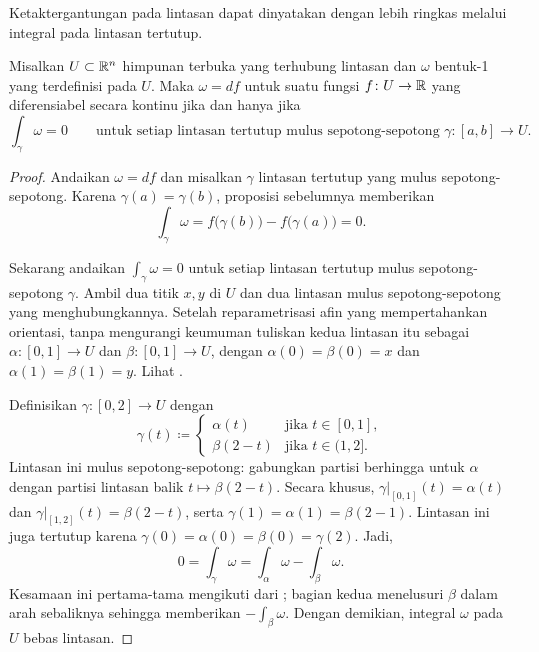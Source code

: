 Ketaktergantungan pada lintasan dapat dinyatakan dengan lebih ringkas melalui
integral pada lintasan tertutup.

\begin{prop}
Misalkan $U \subset {\mathbb{R}}^n$ himpunan terbuka yang terhubung lintasan dan $\omega$
bentuk-1 yang terdefinisi pada $U$. Maka $\omega = df$ untuk suatu fungsi
$f \colon U \to {\mathbb{R}}$ yang diferensiabel secara kontinu jika dan hanya jika
\begin{equation*}
\int_{\gamma} \omega = 0
\qquad
\text{untuk setiap lintasan tertutup mulus sepotong-sepotong }
\gamma \colon [a,b] \to U.
\end{equation*}
\end{prop}

\begin{proof}
Andaikan $\omega = df$ dan misalkan $\gamma$ lintasan tertutup yang mulus
sepotong-sepotong. Karena $\gamma(a) = \gamma(b)$, proposisi sebelumnya
memberikan
\begin{equation*}
\int_{\gamma} \omega = f\bigl(\gamma(b)\bigr) - f\bigl(\gamma(a)\bigr) = 0 .
\end{equation*}

Sekarang andaikan $\int_{\gamma} \omega = 0$ untuk setiap lintasan tertutup
mulus sepotong-sepotong $\gamma$. Ambil dua titik $x,y$ di $U$ dan dua lintasan
mulus sepotong-sepotong yang menghubungkannya. Setelah reparametrisasi afin yang
mempertahankan orientasi, tanpa mengurangi keumuman tuliskan kedua lintasan itu
sebagai $\alpha \colon [0,1] \to U$ dan $\beta \colon [0,1] \to U$, dengan
$\alpha(0) = \beta(0) = x$ dan $\alpha(1) = \beta(1) = y$. Lihat
.
\begin{myfigureht}
\caption{Dua lintasan dari $x$ ke $y$.\label{fig:twopaths}}
\end{myfigureht}

Definisikan $\gamma \colon [0,2] \to U$ dengan
\begin{equation*}
\gamma(t) \coloneqq
\begin{cases}
\alpha(t)  & \text{jika } t \in [0,1], \\
\beta(2-t) & \text{jika } t \in (1,2].
\end{cases}
\end{equation*}
Lintasan ini mulus sepotong-sepotong: gabungkan partisi berhingga untuk
$\alpha$ dengan partisi lintasan balik $t\mapsto\beta(2-t)$. Secara khusus,
$\gamma|_{[0,1]}(t) = \alpha(t)$ dan
$\gamma|_{[1,2]}(t) = \beta(2-t)$, serta
$\gamma(1) = \alpha(1) = \beta(2-1)$. Lintasan ini juga tertutup karena
$\gamma(0) = \alpha(0) = \beta(0) = \gamma(2)$. Jadi,
\begin{equation*}
0 = \int_{\gamma} \omega = \int_{\alpha} \omega - \int_{\beta} \omega .
\end{equation*}
Kesamaan ini pertama-tama mengikuti dari ; bagian
kedua menelusuri $\beta$ dalam arah sebaliknya sehingga memberikan
$-\int_\beta\omega$. Dengan demikian, integral $\omega$ pada $U$ bebas
lintasan.
\end{proof}


